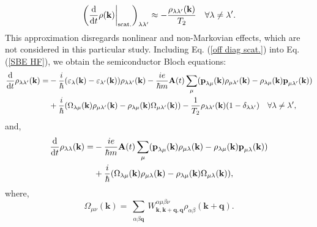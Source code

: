 \documentclass[12pt,english,a4paper]{article}
\begin{document}
\begin{equation}
	\label{off diag scat.}
	\bigg(\dv{ }{t} \rho(\textbf{k})\bigg|_{\mathrm{scat.}}\bigg)_{\lambda \lambda'} \approx -\frac{\rho_{\lambda \lambda'}(\textbf{k})}{T_2}\quad \forall \lambda \neq \lambda'. 
\end{equation}
\quad This approximation disregards nonlinear and non-Markovian effects\cite{haug_quantum_2009}, which are not considered in this particular study. Including Eq. (\ref{off diag scat.}) into Eq. (\ref{SBE HF}), we obtain the semiconductor Bloch equations\cite{haug_quantum_2009}:
\begin{align}
	\label{SBE}
	\dv{ }{t}\rho_{\lambda\lambda'}(\textbf{k}) = &- \frac{i}{\hbar} (\varepsilon_\lambda(\textbf{k}) - \varepsilon_{\lambda'} (\textbf{k}))\rho_{\lambda \lambda'}(\textbf{k}) - \frac{ie}{\hbar m} \textbf{A}(t)\sum_{\mu}(\textbf{p}_{\lambda\mu}(\textbf{k})\rho_{\mu \lambda'}(\textbf{k}) - \rho_{\lambda\mu}(\textbf{k})\textbf{p}_{\mu \lambda'}(\textbf{k})) \nonumber \\
	&+ \frac{i}{\hbar}(\Omega_{\lambda \mu}(\textbf{k})\rho_{\mu \lambda'}(\textbf{k}) - \rho_{\lambda\mu}(\textbf{k}) \Omega_{\mu \lambda'} (\textbf{k})) -\frac{1}{T_2}\rho_{\lambda\lambda'}(\textbf{k})(1-\delta_{\lambda\lambda'})\quad \forall \lambda\neq\lambda',
\end{align}
and,
\begin{align}
	\label{SBE diag}
	\dv{ }{t}\rho_{\lambda\lambda}(\textbf{k}) = & - \frac{ie}{\hbar m} \textbf{A}(t)\sum_{\mu}(\textbf{p}_{\lambda\mu}(\textbf{k})\rho_{\mu \lambda}(\textbf{k}) - \rho_{\lambda\mu}(\textbf{k})\textbf{p}_{\mu \lambda}(\textbf{k})) \nonumber \\
	&+ \frac{i}{\hbar}(\Omega_{\lambda \mu}(\textbf{k})\rho_{\mu \lambda}(\textbf{k}) - \rho_{\lambda\mu}(\textbf{k}) \Omega_{\mu \lambda} (\textbf{k})),
\end{align}
\quad where,
\begin{equation}
	\Omega_{\mu\nu} (\textbf{k})=\sum_{\substack{\alpha\beta \textbf{q}}} W^{\alpha \mu \beta \nu}_{\textbf{k},\textbf{k}+\textbf{q},\textbf{q}} \rho_{\alpha\beta} (\textbf{k}+\textbf{q}).
\end{equation}
\end{document}
